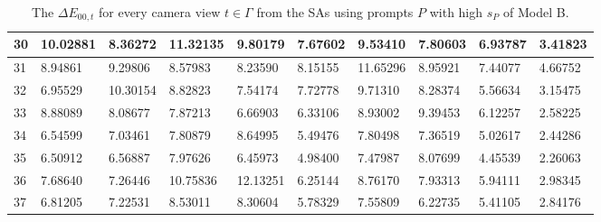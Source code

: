 \begin{table}[H]
{\begin{tabular}{|l|l|l|l|l|l|l|l|l|l|}
        30 & 10.02881 & 8.36272 & 11.32135 & 9.80179 & 7.67602 & 9.53410 & 7.80603 & 6.93787 & 3.41823 \\ \hline
        31 & 8.94861 & 9.29806 & 8.57983 & 8.23590 & 8.15155 & 11.65296 & 8.95921 & 7.44077 & 4.66752 \\ \hline
        32 & 6.95529 & 10.30154 & 8.82823 & 7.54174 & 7.72778 & 9.71310 & 8.28374 & 5.56634 & 3.15475 \\ \hline
        33 & 8.88089 & 8.08677 & 7.87213 & 6.66903 & 6.33106 & 8.93002 & 9.39453 & 6.12257 & 2.58225 \\ \hline
        34 & 6.54599 & 7.03461 & 7.80879 & 8.64995 & 5.49476 & 7.80498 & 7.36519 & 5.02617 & 2.44286 \\ \hline
        35 & 6.50912 & 6.56887 & 7.97626 & 6.45973 & 4.98400 & 7.47987 & 8.07699 & 4.45539 & 2.26063 \\ \hline
        36 & 7.68640 & 7.26446 & 10.75836 & 12.13251 & 6.25144 & 8.76170 & 7.93313 & 5.94111 & 2.98345 \\ \hline
        37 & 6.81205 & 7.22531 & 8.53011 & 8.30604 & 5.78329 & 7.55809 & 6.22735 & 5.41105 & 2.84176 \\ \hline
    \end{tabular}}
	\caption{The $ \Delta E_{00,t}$ for every camera view $t \in \varGamma$ from the SAs using prompts $P$ with high $s_P$ of Model B.}

\end{table}


